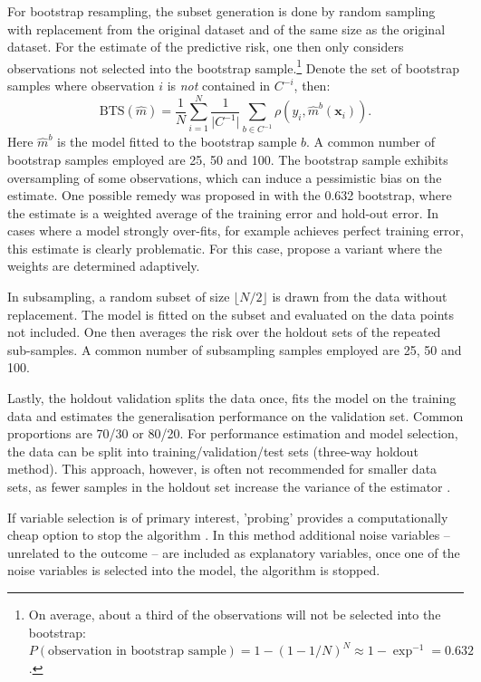 For bootstrap resampling, the subset generation is done by random sampling with replacement from the original dataset and of the same size as the original dataset. For the estimate of the predictive risk, one then only considers observations not selected into the bootstrap sample.\footnote{On average, about a third of the observations will not be selected into the bootstrap: $P(\text{observation in bootstrap sample}) = 1 - (1 - 1 / N)^N \approx 1-\exp^{-1} = 0.632$.} Denote the set of bootstrap samples where observation $i$ is \textit{not} contained in $C^{-i}$, then:
\begin{equation*}
	\text{BTS} (\hat{m}) = \frac{1}{N} \sum_{i = 1}^{N}   \frac{1}{\vert C^{-1} \vert} \sum_{b\in C^{-1}}^{} \rho (y_i, \hat{m}^{b}(\mathbf{x}_i)).
\end{equation*}
Here $\hat{m}^{b}$ is the model fitted to the bootstrap sample $b$. A common number of bootstrap samples employed are 25, 50 and 100. The bootstrap sample exhibits oversampling of some observations, which can induce a pessimistic bias on the estimate. One possible remedy was proposed in \textcite{efronEstimatingErrorRate1983} with the 0.632 bootstrap, where the estimate is a weighted average of the training error and hold-out error. In cases where a model strongly over-fits, for example achieves perfect training error, this estimate is clearly problematic. For this case, \textcite{efronImprovementsCrossValidation6321997} propose a variant where the weights are determined adaptively.

In subsampling, a random subset of size $\lfloor N/2 \rfloor$ is drawn from the data without replacement. The model is fitted on the subset and evaluated on the data points not included. One then averages the risk over the holdout sets of the repeated sub-samples. A common number of subsampling samples employed are 25, 50 and 100.

Lastly, the holdout validation splits the data once, fits the model on the training data and estimates the generalisation performance on the validation set. Common proportions are 70/30 or 80/20. For performance estimation and model selection, the data can be split into training/validation/test sets (three-way holdout method). This approach, however, is often not recommended for smaller data sets, as fewer samples in the holdout set increase the variance of the estimator \autocite{raschkaModelEvaluationModel2020}. 

If variable selection is of primary interest, 'probing' provides a computationally cheap option to stop the algorithm \autocite{thomasProbingSparseFast2017}. In this method additional noise variables -- unrelated to the outcome -- are included as explanatory variables, once one of the noise variables is selected into the model, the algorithm is stopped.  

